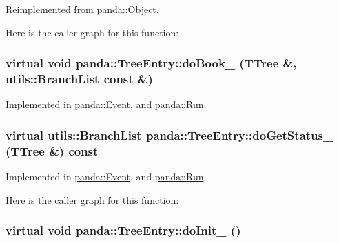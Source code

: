 Reimplemented from \hyperlink{classpanda_1_1Object_a2fcd6665633deef16e86aa4e49135dd7}{panda::Object}.

Here is the caller graph for this function:\hypertarget{classpanda_1_1TreeEntry_a62e77d9db1eec7032b1e31e5edc78a10}{
\subsubsection[{doBook\_\-}]{\setlength{\rightskip}{0pt plus 5cm}virtual void panda::TreeEntry::doBook\_\- (TTree \&, \/  {\bf utils::BranchList} const \&)}}
\label{classpanda_1_1TreeEntry_a62e77d9db1eec7032b1e31e5edc78a10}


Implemented in \hyperlink{classpanda_1_1Event_a3c20f40e1f37f947a5e977c38c53febb}{panda::Event}, and \hyperlink{classpanda_1_1Run_a7f6f2652e76aa39c2e584ce97d1245d3}{panda::Run}.\hypertarget{classpanda_1_1TreeEntry_a649d4a6f2719b68d54c6a7505f5f3105}{
\subsubsection[{doGetStatus\_\-}]{\setlength{\rightskip}{0pt plus 5cm}virtual {\bf utils::BranchList} panda::TreeEntry::doGetStatus\_\- (TTree \&) const}}
\label{classpanda_1_1TreeEntry_a649d4a6f2719b68d54c6a7505f5f3105}


Implemented in \hyperlink{classpanda_1_1Event_a1bd8a01f111c4e14a921a560caef6821}{panda::Event}, and \hyperlink{classpanda_1_1Run_a624aa12a6f703dbedea314cf69f1f04f}{panda::Run}.

Here is the caller graph for this function:\hypertarget{classpanda_1_1TreeEntry_ab78cd4dfd6c017222db541580983fb65}{
\subsubsection[{doInit\_\-}]{\setlength{\rightskip}{0pt plus 5cm}virtual void panda::TreeEntry::doInit\_\- ()}}
\label{classpanda_1_1TreeEntry_ab78cd4dfd6c017222db541580983fb65}


